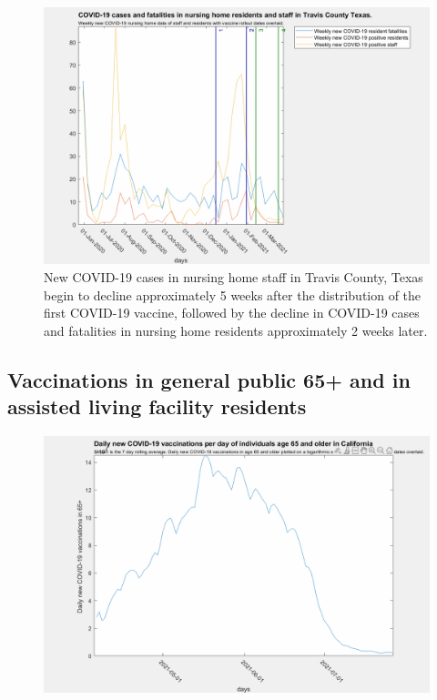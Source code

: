 \documentclass[twoside]{article}
\begin{document}
\begin{multicols}{2}
\begin{figure}[H]
	\includegraphics[width=\linewidth]{images/travis_nursing_home_with_vaccine.png}
	\caption{New COVID-19 cases in nursing home staff in Travis County, Texas begin to decline approximately 5 weeks after the distribution of the first COVID-19 vaccine, followed by the decline in COVID-19 cases and fatalities in nursing home residents approximately 2 weeks later. }
	\label{fig:images/travis_nursing_home_with_vaccineLabel}
\end{figure}

\subsection{Vaccinations in general public 65+ and in assisted living facility residents}

\begin{figure}[H]
	\includegraphics[width=\linewidth]{images/california_65_older.png}
	\caption{}
	\label{fig:images/california_65_olderLabel}
\end{figure}



\end{multicols}
\end{document}
